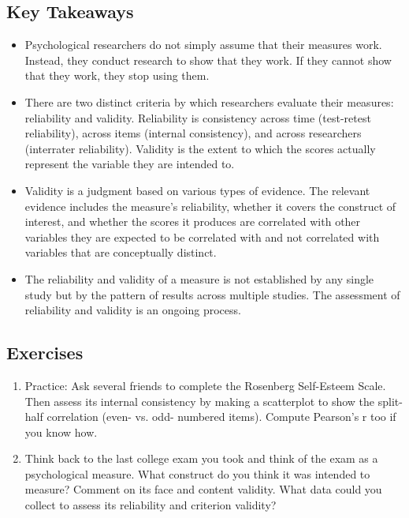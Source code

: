 \subsection{Key Takeaways}
\begin{fullwidth}
\begin{itemize}

\item Psychological researchers do not simply assume that their measures work. Instead, they conduct research to show that they work. If they cannot show that they work, they stop using them.
\item There are two distinct criteria by which researchers evaluate their measures: reliability and
validity. Reliability is consistency across time (test-retest reliability), across items (internal consistency), and across researchers (interrater reliability). Validity is the extent to which the scores actually represent the variable they are intended to.
\item Validity is a judgment based on various types of evidence. The relevant evidence includes the measure's reliability, whether it covers the construct of interest, and whether the scores it produces are correlated with other variables they are expected to be correlated with and not correlated with variables that are conceptually distinct.
\item The reliability and validity of a measure is not established by any single study but by the pattern of results across multiple studies. The assessment of reliability and validity is an ongoing process.

\end{itemize}
\end{fullwidth}


\subsection{Exercises}
\begin{fullwidth}
\begin{enumerate}
\item Practice: Ask several friends to complete the Rosenberg Self-Esteem Scale. Then assess its internal consistency by making a scatterplot to show the split-half correlation (even- vs. odd- numbered items). Compute Pearson's r too if you know how.
\item Think back to the last college exam you took and think of the exam as a psychological measure. What construct do you think it was intended to measure? Comment on its face and content validity. What data could you collect to assess its reliability and criterion validity?
\end{enumerate}
\end{fullwidth}

